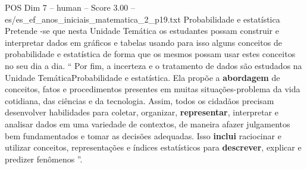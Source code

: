 \begin{textsample}{POS Dim 7 – human – Score 3.00 – es/es\_ef\_anos\_iniciais\_matematica\_2\_p19.txt}  \label{ex:f7_pos_019}
Probabilidade e estatística Pretende -se que nesta Unidade Temática os estudantes possam construir e interpretar dados em gráficos e tabelas usando para isso alguns conceitos de probabilidade e estatística de forma que os mesmos possam usar estes conceitos no seu dia a dia. “ Por fim, a incerteza e o tratamento de dados são estudados na Unidade TemáticaProbabilidade e estatística.
Ela propõe a \textbf{abordagem} de conceitos, fatos e procedimentos presentes em muitas situações-problema da vida cotidiana, das ciências e da tecnologia.
Assim, todos os cidadãos precisam desenvolver habilidades para coletar, organizar, \textbf{representar}, interpretar e analisar dados em uma variedade de contextos, de maneira afazer julgamentos bem fundamentados e tomar as decisões adequadas.
Isso \textbf{inclui} raciocinar e utilizar conceitos, representações e índices estatísticos para \textbf{descrever}, explicar e predizer fenômenos ”.

\end{textsample}
